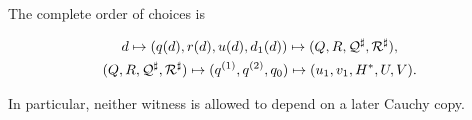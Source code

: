 The complete order of choices is

\begin{equation}\label{eq:quantifier-order}
 \begin{gathered}
 d\mapsto(q(d),r(d),u(d),d_1(d))
 \mapsto(Q,R,\mathcal Q^{\sharp},\mathcal R^{\sharp}),\\
 (Q,R,\mathcal Q^{\sharp},\mathcal R^{\sharp})
 \mapsto(q^{(1)},q^{(2)},q_0)
 \mapsto(u_1,v_1,H^*,U,V).
 \end{gathered}
\end{equation}

In particular, neither witness is allowed to depend on a later Cauchy copy.
